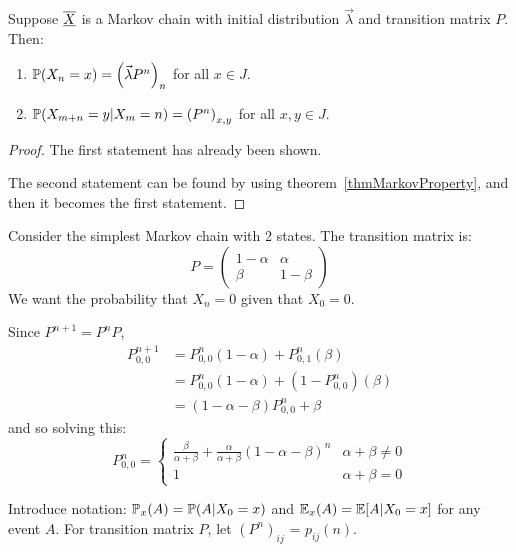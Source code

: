 \documentclass[../Main.tex]{subfiles}
\begin{document}
\begin{theorem}
    Suppose $\chain{X}$ is a Markov chain with initial distribution $\vec{\lambda}$ and transition matrix $P$. Then:
    \begin{enumerate}
        \item $\P(X_n = x) = \left(\vec{\lambda} P^n\right)_n$ for all $x \in J$.
        \item $\P(X_{m + n} = y | X_m = n) = \left(P^n\right)_{x, y}$ for all $x, y \in J$.
    \end{enumerate}
    \label{thmMarkovMatPower}
\end{theorem}
\begin{proof}
    The first statement has already been shown.

    The second statement can be found by using theorem~\ref{thmMarkovProperty}, and then it becomes the first statement.
\end{proof}
\begin{example}
    Consider the simplest Markov chain with 2 states.
    The transition matrix is:
    \begin{equation*}
        P = 
        \begin{pmatrix}
            1 - \alpha & \alpha \\
            \beta & 1 - \beta
        \end{pmatrix}
    \end{equation*}
    We want the probability that $X_n = 0$ given that $X_0 = 0$.

    Since $P^{n+1} = P^n P$, 
    \begin{align*}
        P_{0, 0}^{n+1} &= P_{0, 0}^n (1 - \alpha) + P_{0, 1}^n (\beta) \\
        &= P_{0, 0}^n (1 - \alpha) + (1 - P_{0, 0}^n) (\beta) \\
        &= (1 - \alpha - \beta) P_{0, 0}^n + \beta
    \end{align*}
    and so solving this:
    \begin{equation*}
        P_{0, 0}^n =
        \begin{cases}
            \frac{\beta}{\alpha + \beta} + \frac{\alpha}{\alpha + \beta} (1 - \alpha - \beta)^n & \alpha + \beta \neq 0 \\
            1 & \alpha + \beta = 0
        \end{cases}
    \end{equation*}
\end{example}
Introduce notation:
$\P_x(A) = \P(A | X_0 = x)$ and $\E_x(A) = \E[A | X_0 = x]$ for any event $A$. For transition matrix $P$, let $(P^n)_{ij}$ = $p_{ij}(n)$.
\end{document}
